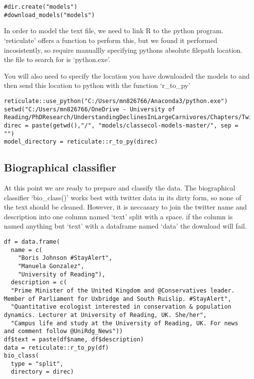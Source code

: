 \documentclass[]{article}
\begin{document}
\begin{verbatim}
#dir.create("models")
#download_models("models")
\end{verbatim}

In order to model the text file, we need to link R to the python
program. `reticulate' offers a function to perform this, but we found it
performed incosistently, so require manuallly specifying pythons
absolute filepath location. the file to search for is `python.exe'.

You will also need to specify the location you have downloaded the
models to and then send this location to python with the function
`r\_to\_py'

\begin{verbatim}
reticulate::use_python("C:/Users/mn826766/Anaconda3/python.exe")
setwd("C:/Users/mn826766/OneDrive - University of Reading/PhDResearch/UnderstandingDeclinesInLargeCarnivores/Chapters/Twitter/ClassifyTweets/Manuscript")
direc = paste(getwd(),"/", "models/classecol-models-master/", sep = "")
model_directory = reticulate::r_to_py(direc)
\end{verbatim}

\subsection{Biographical classifier}\label{biographical-classifier}

At this point we are ready to prepare and classify the data. The
biographical classifier `bio\_class()' works best with twitter data in
its dirty form, so none of the text should be cleaned. However, it is
neccasary to join the twitter name and description into one column named
`text' split with a space. if the column is named anything but `text'
with a dataframe named `data' the download will fail.

\begin{verbatim}
df = data.frame(
  name = c(
    "Boris Johnson #StayAlert",
    "Manuela Gonzalez",
    "University of Reading"),
  description = c(
  "Prime Minister of the United Kingdom and @Conservatives leader. Member of Parliament for Uxbridge and South Ruislip. #StayAlert", 
  "Quantitative ecologist interested in conservation & population dynamics. Lecturer at University of Reading, UK. She/her", 
  "Campus life and study at the University of Reading, UK. For news and comment follow @UniRdg_News"))
df$text = paste(df$name, df$description)
data = reticulate::r_to_py(df)
bio_class(
  type = "split",
  directory = direc)
\end{verbatim}
\end{document}
